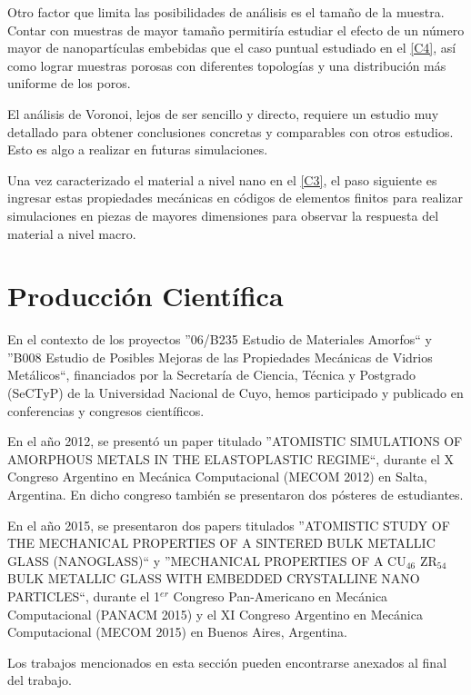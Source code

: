 Otro factor que limita las posibilidades de análisis es el tamaño de la muestra. Contar con muestras de mayor tamaño permitiría estudiar el efecto de un  número mayor de nanopartículas embebidas que el caso puntual estudiado en el \cref{C4}, así como lograr muestras porosas con diferentes topologías y una distribución más uniforme de los poros.

El análisis de Voronoi, lejos de ser sencillo y directo, requiere un estudio muy detallado para obtener conclusiones concretas y comparables con otros estudios. Esto es algo a realizar en futuras simulaciones.

Una vez caracterizado el material a nivel nano en el \cref{C3}, el paso siguiente es ingresar estas propiedades mecánicas en códigos de elementos finitos para realizar simulaciones en piezas de mayores dimensiones para observar la respuesta del material a nivel macro.

\section{Producción Científica}

En el contexto de los proyectos ''06/B235 Estudio de Materiales Amorfos`` y ''B008 Estudio de Posibles Mejoras de las Propiedades Mecánicas de Vidrios Metálicos``, financiados por la Secretaría de Ciencia, Técnica y Postgrado (SeCTyP) de la Universidad Nacional de Cuyo, hemos participado y publicado en conferencias y congresos científicos.

En el año 2012, se presentó un paper titulado ''ATOMISTIC SIMULATIONS OF AMORPHOUS METALS IN THE ELASTOPLASTIC REGIME``, durante el X Congreso Argentino en Mecánica Computacional (MECOM 2012) en Salta, Argentina. En dicho congreso también se presentaron dos pósteres de estudiantes.

En el año 2015, se presentaron dos papers titulados ''ATOMISTIC STUDY OF THE MECHANICAL PROPERTIES OF A SINTERED BULK METALLIC GLASS (NANOGLASS)`` y ''MECHANICAL PROPERTIES OF A CU$_{46}$ ZR$_{54}$ BULK METALLIC GLASS WITH EMBEDDED CRYSTALLINE NANO PARTICLES``, durante el 1$^{er}$ Congreso Pan-Americano en Mecánica Computacional (PANACM 2015) y el XI Congreso Argentino en Mecánica Computacional (MECOM 2015) en Buenos Aires, Argentina.

Los trabajos mencionados en esta sección pueden encontrarse anexados al final del trabajo.






